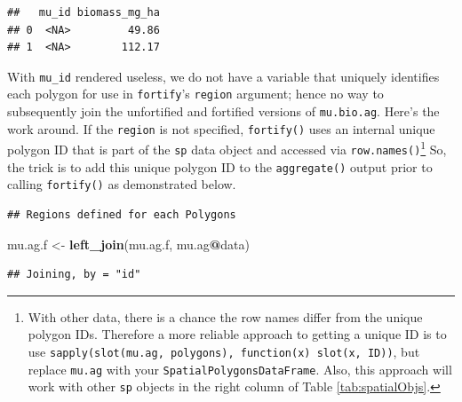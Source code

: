 \documentclass[
]{krantz}
\newenvironment{Shaded}{\begin{snugshade}}{\end{snugshade}}
\newcommand{\KeywordTok}[1]{\textcolor[rgb]{0.13,0.29,0.53}{\textbf{#1}}}
\newcommand{\NormalTok}[1]{#1}
\newcommand{\OperatorTok}[1]{\textcolor[rgb]{0.81,0.36,0.00}{\textbf{#1}}}
\newcommand{\StringTok}[1]{\textcolor[rgb]{0.31,0.60,0.02}{#1}}
\begin{document}
\begin{verbatim}
##   mu_id biomass_mg_ha
## 0  <NA>         49.86
## 1  <NA>        112.17
\end{verbatim}

With \texttt{mu\_id} rendered useless, we do not have a variable that uniquely identifies each polygon for use in \texttt{fortify}'s \texttt{region} argument; hence no way to subsequently join the unfortified and fortified versions of \texttt{mu.bio.ag}. Here's the work around. If the \texttt{region} is not specified, \texttt{fortify()} uses an internal unique polygon ID that is part of the \texttt{sp} data object and accessed via \texttt{row.names()}\footnote{With other data, there is a chance the row names differ from the unique polygon IDs. Therefore a more reliable approach to getting a unique ID is to use \texttt{sapply(slot(mu.ag,\ \textquotesingle{}polygons\textquotesingle{}),\ function(x)\ slot(x,\ \textquotesingle{}ID\textquotesingle{}))}, but replace \texttt{mu.ag} with your \texttt{SpatialPolygonsDataFrame}. Also, this approach will work with other \texttt{sp} objects in the right column of Table \ref{tab:spatialObjs}.} So, the trick is to add this unique polygon ID to the \texttt{aggregate()} output prior to calling \texttt{fortify()} as demonstrated below.

\begin{Shaded}
\end{Shaded}

\begin{verbatim}
## Regions defined for each Polygons
\end{verbatim}

\begin{Shaded}
\begin{Highlighting}[]
\NormalTok{mu.ag.f \textless{}{-}}\StringTok{ }\KeywordTok{left\_join}\NormalTok{(mu.ag.f, mu.ag}\OperatorTok{@}\NormalTok{data)}
\end{Highlighting}
\end{Shaded}

\begin{verbatim}
## Joining, by = "id"
\end{verbatim}
\end{document}

